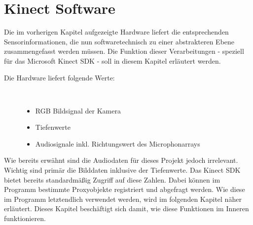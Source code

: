 \section{Kinect Software}\label{Software}



%
%
%		
%




Die im vorherigen Kapitel aufgezeigte Hardware liefert die entsprechenden Sensorinformationen, die nun
softwaretechnisch zu einer abstrakteren Ebene zusammengefasst werden müssen. Die Funktion dieser
Verarbeitungen - speziell für das Microsoft Kinect SDK - soll in diesem Kapitel erläutert werden.

\begin{description}
	\item[Die Hardware liefert folgende Werte:]~\par
	\begin{itemize}
		\item RGB Bildsignal der Kamera
		\item Tiefenwerte
		\item Audiosignale inkl. Richtungswert des Microphonarrays
	\end{itemize}
\end{description}

\noindent
Wie bereits erwähnt sind die Audiodaten für dieses Projekt jedoch irrelevant. Wichtig sind primär die Bilddaten inklusive der Tiefenwerte.
Das Kinect SDK bietet bereits standardmäßig Zugriff auf diese Zahlen. Dabei können im Programm bestimmte Proxyobjekte registriert und abgefragt werden. Wie diese im Programm letztendlich verwendet werden,
wird im folgenden Kapitel  näher erläutert. Dieses Kapitel beschäftigt sich
damit, wie diese Funktionen im Inneren funktionieren.

%
%
%
